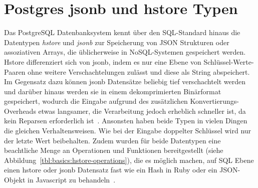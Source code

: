 
\section{Postgres jsonb und hstore Typen}
Das PostgreSQL Datenbanksystem kennt über den SQL-Standard hinaus die Datentypen \emph{hstore} und \emph{jsonb} zur Speicherung von JSON Strukturen oder assoziativen Arrays,
die üblicherweise in NoSQL-Systemen gespeichert werden.
Hstore differenziert sich von jsonb, indem es nur eine Ebene von Schlüssel-Werte-Paaren ohne weitere Verschachtelungen zulässt und
diese als String abspeichert.
Im Gegensatz dazu können jsonb Datensätze beliebig tief verschachtelt werden und
darüber hinaus werden sie in einem dekomprimierten Binärformat gespeichert, wodurch die Eingabe aufgrund des zusätzlichen Konvertierungs-Overheads etwas langsamer,
die Verarbeitung jedoch erheblich schneller ist, da kein Reparsen erforderlich ist~\cite{postgresql-json}.
Ansonsten haben beide Typen in vielen Dingen die gleichen Verhaltensweisen. Wie bei der Eingabe doppelter Schlüssel wird nur der letzte Wert beibehalten.
Zudem wurden für beide Datentypen eine beachtliche Menge an Operationen und Funktionen bereitgestellt (siehe Abbildung~\ref{tbl:basics:hstore-operations}), die es möglich machen,
auf SQL Ebene einen hstore oder jsonb Datensatz fast wie ein Hash in Ruby oder ein JSON-Objekt in Javascript zu behandeln~\cite{postgresql-hstore}.

